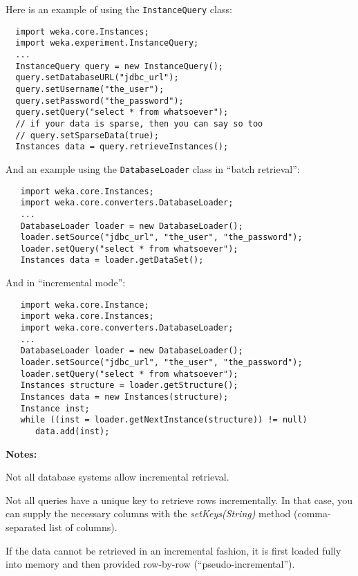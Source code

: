 \noindent Here is an example of using the \texttt{InstanceQuery} class:
\begin{verbatim}
  import weka.core.Instances;
  import weka.experiment.InstanceQuery;
  ...
  InstanceQuery query = new InstanceQuery();
  query.setDatabaseURL("jdbc_url");
  query.setUsername("the_user");
  query.setPassword("the_password");
  query.setQuery("select * from whatsoever");
  // if your data is sparse, then you can say so too
  // query.setSparseData(true);
  Instances data = query.retrieveInstances();
\end{verbatim}
And an example using the \texttt{DatabaseLoader} class in ``batch retrieval'':
\begin{verbatim}
   import weka.core.Instances;
   import weka.core.converters.DatabaseLoader;
   ...
   DatabaseLoader loader = new DatabaseLoader();
   loader.setSource("jdbc_url", "the_user", "the_password");
   loader.setQuery("select * from whatsoever");
   Instances data = loader.getDataSet();
\end{verbatim}

\samepage
\noindent And in ``incremental mode'':
\begin{verbatim}
   import weka.core.Instance;
   import weka.core.Instances;
   import weka.core.converters.DatabaseLoader;
   ...
   DatabaseLoader loader = new DatabaseLoader();
   loader.setSource("jdbc_url", "the_user", "the_password");
   loader.setQuery("select * from whatsoever");
   Instances structure = loader.getStructure();
   Instances data = new Instances(structure);
   Instance inst;
   while ((inst = loader.getNextInstance(structure)) != null)
      data.add(inst);
\end{verbatim}
\textbf{Notes:}
\begin{tight_itemize}
	\item Not all database systems allow incremental retrieval.
	\item Not all queries have a unique key to retrieve rows incrementally. In
that case, you can supply the necessary columns with the
\textit{setKeys(String)} method (comma-separated list of columns).
	\item If the data cannot be retrieved in an incremental fashion, it is first
loaded fully into memory and then provided row-by-row (``pseudo-incremental'').
\end{tight_itemize}

\newpage

